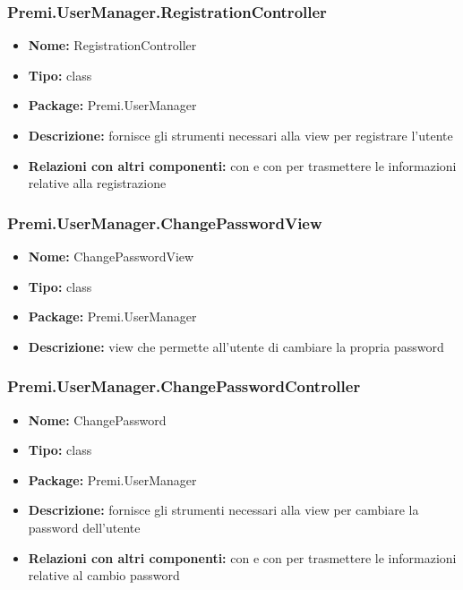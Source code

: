 \subsubsection{Premi.UserManager.RegistrationController}
\begin{itemize}
  \item \textbf{Nome:} RegistrationController
  \item \textbf{Tipo:} class
  \item \textbf{Package:} Premi.UserManager
  \item \textbf{Descrizione:} fornisce gli strumenti necessari alla view per registrare l'utente
  \item \textbf{Relazioni con altri componenti:} con  e con  per trasmettere le informazioni relative alla registrazione
\end{itemize}
\subsubsection{Premi.UserManager.ChangePasswordView}
\begin{itemize}
  \item \textbf{Nome:} ChangePasswordView
  \item \textbf{Tipo:} class
  \item \textbf{Package:} Premi.UserManager
  \item \textbf{Descrizione:} view che permette all'utente di cambiare la propria password
\end{itemize}
\subsubsection{Premi.UserManager.ChangePasswordController}
\begin{itemize}
  \item \textbf{Nome:} ChangePassword
  \item \textbf{Tipo:} class
  \item \textbf{Package:} Premi.UserManager
  \item \textbf{Descrizione:} fornisce gli strumenti necessari alla view per cambiare la password dell'utente
  \item \textbf{Relazioni con altri componenti:} con  e con  per trasmettere le informazioni relative al cambio password
\end{itemize}

